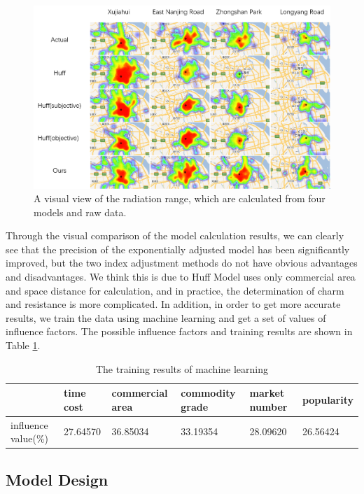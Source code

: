 \documentclass[journal]{IEEEtran}
\begin{document}
\begin{figure}[tb]
\centering
\includegraphics[width=1.8\columnwidth]{figure4.png}
\caption{A visual view of the radiation range, which are calculated from four models and raw data.}
\label{fig:Five-model-compare}
\end{figure}

Through the visual comparison of the model calculation results, we can clearly see that the precision of the exponentially adjusted model has been significantly improved, but the two index adjustment methods do not have obvious advantages and disadvantages. We think this is due to Huff Model uses only commercial area and space distance for calculation, and in practice, the determination of charm and resistance is more complicated. In addition, in order to get more accurate results, we train the data using machine learning and get a set of values of influence factors. The possible influence factors and training results are shown in Table \ref{tab:machine-learning}.

\begin{table}[ht]
\centering
\normalsize
\caption{The training results of machine learning}
\begin{tabular}{|l|l|l|l|l|l|}\hline
       &time cost&commercial area&commodity grade&market number&popularity\\\hline
      influence value(\%)&27.64570&36.85034&33.19354&28.09620&26.56424\\
      \hline
\end{tabular}
\label{tab:machine-learning}
\end{table}



\subsection{Model Design}
\end{document}
